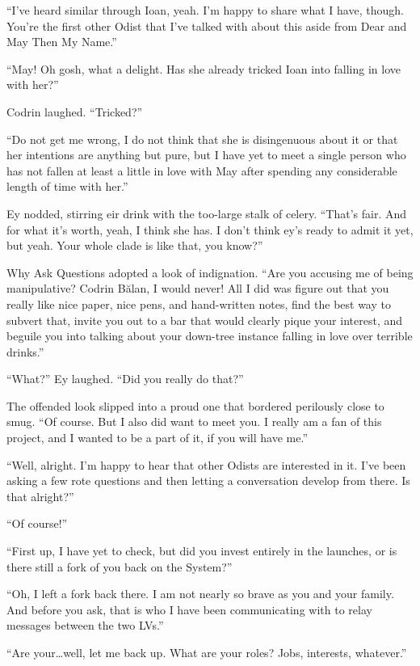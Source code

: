 ``I've heard similar through Ioan, yeah. I'm happy to share what I have, though. You're the first other Odist that I've talked with about this aside from Dear and May Then My Name.''

``May! Oh gosh, what a delight. Has she already tricked Ioan into falling in love with her?''

Codrin laughed. ``Tricked?''

``Do not get me wrong, I do not think that she is disingenuous about it or that her intentions are anything but pure, but I have yet to meet a single person who has not fallen at least a little in love with May after spending any considerable length of time with her.''

Ey nodded, stirring eir drink with the too-large stalk of celery. ``That's fair. And for what it's worth, yeah, I think she has. I don't think ey's ready to admit it yet, but yeah. Your whole clade is like that, you know?''

Why Ask Questions adopted a look of indignation. ``Are you accusing me of being manipulative? Codrin Bălan, I would never! All I did was figure out that you really like nice paper, nice pens, and hand-written notes, find the best way to subvert that, invite you out to a bar that would clearly pique your interest, and beguile you into talking about your down-tree instance falling in love over terrible drinks.''

``What?'' Ey laughed. ``Did you really do that?''

The offended look slipped into a proud one that bordered perilously close to smug. ``Of course. But I also did want to meet you. I really am a fan of this project, and I wanted to be a part of it, if you will have me.''

``Well, alright. I'm happy to hear that other Odists are interested in it. I've been asking a few rote questions and then letting a conversation develop from there. Is that alright?''

``Of course!''

``First up, I have yet to check, but did you invest entirely in the launches, or is there still a fork of you back on the System?''

``Oh, I left a fork back there. I am not nearly so brave as you and your family. And before you ask, that is who I have been communicating with to relay messages between the two LVs.''

``Are your\ldots well, let me back up. What are your roles? Jobs, interests, whatever.''

